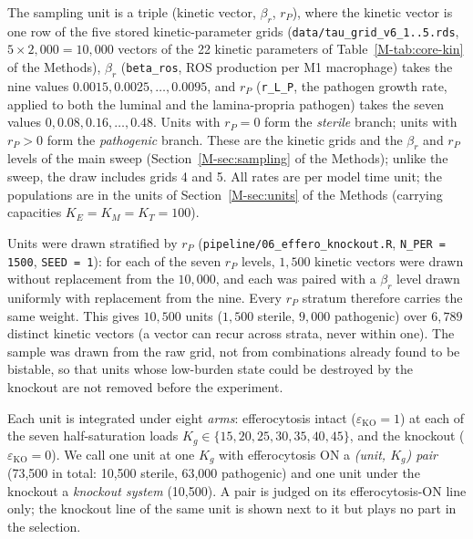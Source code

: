 \documentclass[11pt]{article}
\newcommand{\bros}{\beta_r}
\begin{document}
The sampling unit is a triple (kinetic vector, $\beta_r$, $r_P$), where the
kinetic vector is one row of the five stored kinetic-parameter grids
(\texttt{data/tau\_grid\_v6\_1..5.rds}, $5\times 2{,}000 = 10{,}000$ vectors of the 22
kinetic parameters of Table~\ref{M-tab:core-kin} of the Methods), $\beta_r$ (\texttt{beta\_ros}, ROS
production per M1 macrophage) takes the nine values $0.0015, 0.0025, \dots, 0.0095$,
and $r_P$ (\texttt{r\_L\_P}, the pathogen growth rate, applied to both the
luminal and the lamina-propria pathogen) takes the seven
values $0, 0.08, 0.16, \dots, 0.48$. Units with $r_P = 0$ form the \emph{sterile}
branch; units with $r_P > 0$ form the \emph{pathogenic} branch. These are the kinetic grids and the $\bros$ and $r_P$ levels of the main sweep
(Section~\ref{M-sec:sampling} of the Methods); unlike the sweep, the draw includes grids 4 and 5. All
rates are per model time unit; the populations are in the units of
Section~\ref{M-sec:units} of the Methods (carrying capacities $K_E = K_M = K_T = 100$).

Units were drawn stratified by $r_P$ (\texttt{pipeline/06\_effero\_knockout.R},
\texttt{N\_PER = 1500}, \texttt{SEED = 1}): for each of the seven $r_P$ levels,
$1{,}500$ kinetic vectors were drawn without replacement from the $10{,}000$, and each
was paired with a $\beta_r$ level drawn uniformly with replacement from the nine.
Every $r_P$ stratum therefore carries the same weight. This gives
$10{,}500$ units ($1{,}500$ sterile, $9{,}000$ pathogenic) over $6{,}789$ distinct
kinetic vectors (a vector can recur across strata, never within one).
The sample was drawn from the raw grid, not from combinations already found to be
bistable, so that units whose low-burden state could be destroyed by the knockout
are not removed before the experiment.

Each unit is integrated under eight \emph{arms}: efferocytosis intact
($\varepsilon_{\mathrm{KO}} = 1$) at each of the seven half-saturation loads
$K_g \in \{15, 20, 25, 30, 35, 40, 45\}$, and the knockout
($\varepsilon_{\mathrm{KO}} = 0$). We call one unit at one $K_g$ with efferocytosis ON a
\emph{(unit, $K_g$) pair} (73,500 in total: 10,500 sterile, 63,000 pathogenic) and one unit
under the knockout a \emph{knockout system} (10,500). A pair is judged on its
efferocytosis-ON line only; the knockout line of the same unit is shown next to it but
plays no part in the selection.
\end{document}
